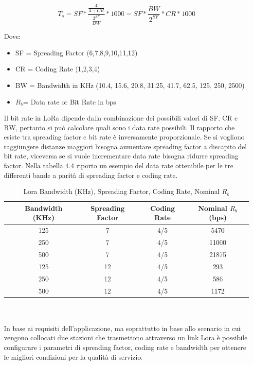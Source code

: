 \documentclass[12pt,a4paper,openright,twoside]{report}
\begin{document}
\begin{equation*} T_s = SF * \frac{\tfrac{4}{4+CR}}{\tfrac{2^{SF}}{BW}} * 1000 = SF * \frac{BW}{2^{SF}} * CR * 1000 \end{equation*}

Dove:
\begin{itemize}                       
\item SF = Spreading Factor (6,7,8,9,10,11,12)
\item CR = Coding Rate (1,2,3,4)
\item BW = Bandwidth in KHz (10.4, 15.6, 20.8, 31.25, 41.7, 62.5, 125, 250, 2500)
\item $R_b$= Data rate or Bit Rate in bps 
\end{itemize}
Il bit rate in LoRa dipende dalla combinazione dei possibili valori di SF, CR e BW, pertanto si pu\`o calcolare quali sono i data rate possibili.
Il rapporto che esiste tra spreading factor e bit rate \`e inversamente proporzionale. Se si vogliono raggiungere distanze maggiori bisogna aumentare spreading factor a discapito del bit rate, viceversa se si vuole incrementare data rate bisogna ridurre spreading factor. Nella tabella 4.4 riporto un esempio del data rate ottenibile per le tre differenti bande a parit\`a di spreading factor e coding rate. 
\\
\begin{table}
\begin{center}
\begin{tabular}{lcccc}
&Bandwidth (KHz)&Spreading Factor&Coding Rate&Nominal $R_b$ (bps)\\ \hline\hline
&125&7&4/5&5470\\
\hline
&250&7&4/5&11000\\
\hline
&500&7&4/5&21875\\
\hline
&125&12&4/5&293\\
\hline
&250&12&4/5&586\\
\hline
&500&12&4/5&1172\\
\hline
\end{tabular}
\caption[Lora Bandwidth (KHz), Spreading Factor, Coding Rate, Nominal $R_b$ ]{Lora Bandwidth (KHz), Spreading Factor, Coding Rate, Nominal $R_b$ }\label{tab:quattro}
\end{center}
\end{table}
\\
\\
In base ai requisiti dell'applicazione, ma soprattutto in base allo scenario in cui vengono collocati due stazioni che trasmettono attraverso un link Lora \`e possibile configurare i parametri di spreading factor, coding rate e bandwidth per ottenere le migliori condizioni per la qualit\`a di servizio.
\end{document}
